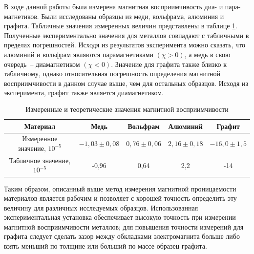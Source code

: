 \documentclass[a4paper,12pt]{article} %
\begin{document}
В ходе данной работы была измерена магнитная восприимчивость диа- и пара- магнетиков. Были исследованы образцы из меди, вольфрама, алюминия и графита. Табличные значения измеренных величин представлены в таблице \ref{tabres}. Полученные экспериментально значения для металлов совпадают с табличными в пределах погрешностей. Исходя из результатов эксперимента можно сказать, что алюминий и вольфрам являются парамагнетиками $ (\chi > 0) $, а медь в свою очередь~-- диамагнетиком $ (\chi < 0) $. Значение для графита также близко к табличному, однако относительная погрешность определения магнитной восприимчивости в данном случае выше, чем для остальных образцов. Исходя из эксперимента, графит также является диамагнетиком.

\begin{table}[h!]
\begin{center}
\begin{tabular}{|c|c|c|c|c|}
\hline
Материал & Медь & Вольфрам & Алюминий & Графит \\ \hline
Измеренное значение, $10^{-5}$ & $-1,03\pm 0,08$ & $0,76\pm 0,06$ & $2,16 \pm 0,18$ & $-16,0 \pm 1,5$ \\ \hline
Табличное значение, $10^{-5}$ & -0,96 & 0,64 & 2,2 & -14 \\ \hline
\end{tabular}
\end{center}
\caption{Измеренные и теоретические значения магнитной восприимчивости}
\label{tabres}
\end{table}

Таким образом, описанный выше метод измерения магнитной проницаемости материалов является рабочим и позволяет с хорошей точность определить эту величину для различных исследуемых образцов. Использованная экспериментальная установка обеспечивает высокую точность при измерении магнитной восприимчивости металлов; для повышения точности измерений для графита следует сделать зазор между обкладками электромагнита больше либо взять меньший по толщине или больший по массе образец графита.
\end{document}
